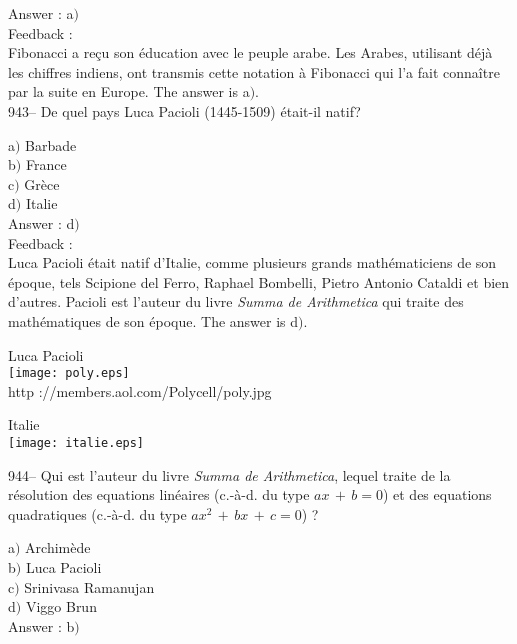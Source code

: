 \documentclass[letterpaper, 12pt]{article}
\begin{document}
Answer : a$)$\\

Feedback : \\
Fibonacci a re\c cu son \'education avec le peuple arabe. Les
Arabes, utilisant d\'ej\`a les chiffres indiens, ont transmis
cette notation \`a Fibonacci qui l'a fait conna\^itre par la suite en
Europe. The answer is a$)$.\\

943-- De quel pays Luca Pacioli (1445-1509) \'etait-il natif?

a$)$ Barbade \\
b$)$ France  \\
c$)$ Gr\`ece \\
d$)$ Italie \\

Answer : d$)$\\

Feedback :\\
Luca Pacioli \'etait natif d'Italie, comme plusieurs grands
math\'ematiciens de son \'epoque, tels Scipione del Ferro, Raphael
Bombelli, Pietro Antonio Cataldi et bien d'autres. Pacioli
est l'auteur du livre {\sl Summa de Arithmetica} qui traite des
math\'ematiques de son \'epoque. The answer is d$)$.\\

        \begin{center}
        Luca Pacioli\\
    \texttt{[image: poly.eps]}\\
        {\footnotesize http ://members.aol.com/Polycell/poly.jpg}
    \end{center}

        \begin{center}
        Italie\\
    \texttt{[image: italie.eps]}\\
    \end{center}

944-- Qui est l'auteur du livre {\sl Summa de Arithmetica}, lequel
traite de la r\'esolution des equations lin\'eaires (c.-\`a-d. du
type $ax\,+\,b=0$) et des equations quadratiques (c.-\`a-d. du
type $ax^2\,+\,bx\,+\,c=0$) ?

a$)$ Archim\`ede \\
b$)$ Luca Pacioli  \\
c$)$ Srinivasa Ramanujan \\
d$)$ Viggo Brun \\

Answer : b$)$\\
\end{document}
